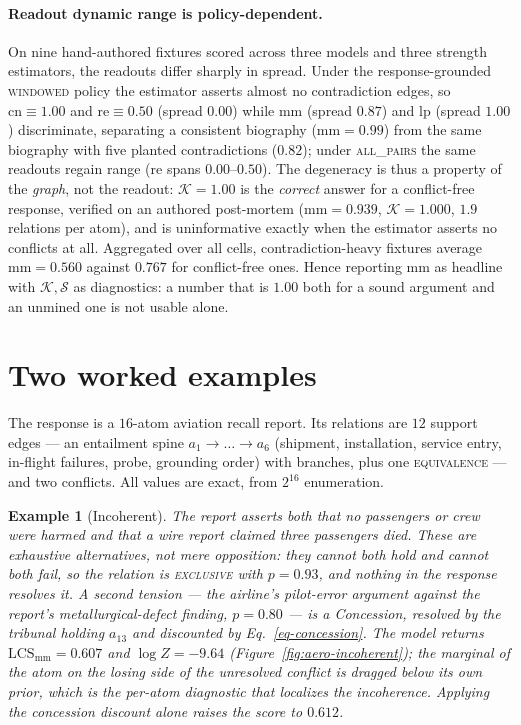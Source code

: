 \documentclass{article} %
\newtheorem{example}{Example}
\newcommand{\coupling}[1]{\textsc{#1}}          %
\newcommand{\sense}[1]{\textsf{#1}}             %
\newcommand{\LCS}{\mathrm{LCS}}
\newcommand{\readout}[1]{\ensuremath{\mathrm{#1}}}
\newcommand{\mm}{\readout{mm}}
\newcommand{\cons}{\readout{cn}}
\newcommand{\rei}{\readout{re}}
\newcommand{\lp}{\readout{lp}}
\begin{document}
\paragraph{Readout dynamic range is policy-dependent.} On nine hand-authored fixtures scored
across three models and three strength estimators, the readouts differ sharply in spread. Under the
response-grounded \textsc{windowed} policy the estimator asserts almost no contradiction edges, so
$\cons\equiv1.00$ and $\rei\equiv0.50$ (spread $0.00$) while $\mm$ (spread $0.87$) and $\lp$
(spread $1.00$) discriminate, separating a consistent biography ($\mm=0.99$) from the same
biography with five planted contradictions ($0.82$); under \textsc{all\_pairs} the same readouts
regain range ($\rei$ spans $0.00$--$0.50$). The degeneracy is thus a property of the \emph{graph},
not the readout: $\mathcal{K}=1.00$ is the \emph{correct} answer for a conflict-free response,
verified on an authored post-mortem ($\mm=0.939$, $\mathcal{K}=1.000$, $1.9$ relations per atom),
and is uninformative exactly when the estimator asserts no conflicts at all. Aggregated over all
cells, contradiction-heavy fixtures average $\mm=0.560$ against $0.767$ for conflict-free ones.
Hence reporting $\mm$ as headline with $\mathcal{K},\mathcal{S}$ as diagnostics: a number that is
$1.00$ both for a sound argument and an unmined one is not usable alone.

\section{Two worked examples}
\label{sec-examples}



The response is a $16$-atom aviation recall report. Its relations are $12$ support edges --- an
entailment spine $a_1\!\to\!\dots\!\to\!a_6$ (shipment, installation, service entry, in-flight
failures, probe, grounding order) with branches, plus one \coupling{equivalence} --- and two
conflicts. All values are exact, from $2^{16}$ enumeration.

\begin{example}[Incoherent]
\label{ex-incoherent}
The report asserts both that \emph{no passengers or crew were harmed} and that a wire report
\emph{claimed three passengers died}. These are exhaustive alternatives, not mere opposition:
they cannot both hold and cannot both fail, so the relation is \coupling{exclusive} with
$p=0.93$, and nothing in the response resolves it. A second tension --- the airline's
pilot-error argument against the report's metallurgical-defect finding, $p=0.80$ --- is a
\sense{Concession}, resolved by the tribunal holding $a_{13}$ and discounted by
Eq.~\ref{eq-concession}. The model returns $\LCS_{\mm}=0.607$ and $\log Z=-9.64$
(Figure~\ref{fig:aero-incoherent}); the marginal of the atom on the losing side of the
unresolved conflict is dragged \emph{below} its own prior, which is the per-atom diagnostic
that localizes the incoherence. Applying the concession discount alone raises the score to
$0.612$.
\end{example}
\end{document}
